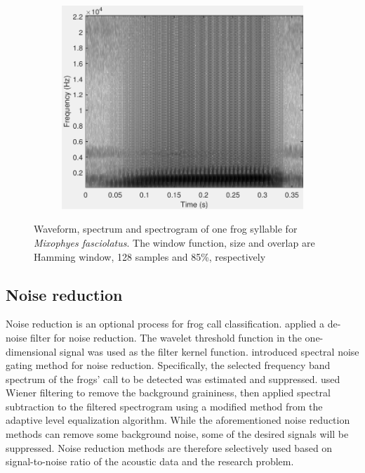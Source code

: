 \begin{figure}[htb!]
\begin{subfigure}[b]{0.32\textwidth}
           \includegraphics[width=1\textwidth,height=0.75\textwidth]{image/LR/spectrogram.pdf}
    \end{subfigure}%
\caption[Waveform, spectrum and spectrogram of one frog syllable]{Waveform, spectrum and spectrogram of one frog syllable for \textit{Mixophyes fasciolatus}. The window function, size and overlap are Hamming window, 128 samples and 85\%, respectively}
\label{fig:spectrogram}       %
\end{figure}





\subsection{Noise reduction}
Noise reduction is an optional process for frog call classification. 
\cite{Huang20141} applied a de-noise filter for noise reduction. The wavelet threshold function in the one-dimensional signal was used as the filter kernel function.
\cite{bedoya2014automatic} introduced spectral noise gating method for noise reduction. Specifically, the selected frequency band spectrum of the frogs' call to be detected was estimated and suppressed. \cite{emr2015Xie} used Wiener filtering to remove the background graininess, then applied spectral subtraction to the filtered spectrogram using a modified method from the adaptive level equalization algorithm. While the aforementioned noise reduction methods can remove some background noise, some of the desired signals will be suppressed. Noise reduction methods are therefore selectively used based on signal-to-noise ratio of the acoustic data and the research problem.




